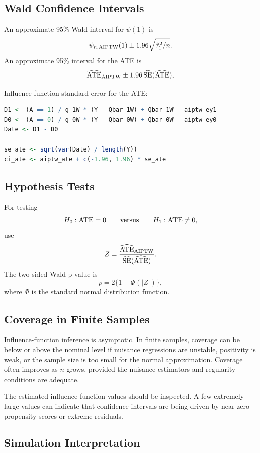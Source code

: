 \subsection{Wald Confidence Intervals}

An approximate 95\% Wald interval for $\psi(1)$ is
\[
\psi_{n,\operatorname{AIPTW}}(1)
\pm
1.96\sqrt{\hat\tau_1^2/n}.
\]
An approximate 95\% interval for the ATE is
\[
\widehat{\operatorname{ATE}}_{\operatorname{AIPTW}}
\pm
1.96\,\widehat{\mathrm{SE}}(\widehat{\operatorname{ATE}}).
\]

\begin{implementationbox}
Influence-function standard error for the ATE:
\begin{lstlisting}[language=R]
D1 <- (A == 1) / g_1W * (Y - Qbar_1W) + Qbar_1W - aiptw_ey1
D0 <- (A == 0) / g_0W * (Y - Qbar_0W) + Qbar_0W - aiptw_ey0
Date <- D1 - D0

se_ate <- sqrt(var(Date) / length(Y))
ci_ate <- aiptw_ate + c(-1.96, 1.96) * se_ate
\end{lstlisting}
\end{implementationbox}

\subsection{Hypothesis Tests}

For testing
\[
H_0:\operatorname{ATE}=0
\qquad\text{versus}\qquad
H_1:\operatorname{ATE}\neq 0,
\]
use
\[
Z=\frac{\widehat{\operatorname{ATE}}_{\operatorname{AIPTW}}}
{\widehat{\mathrm{SE}}(\widehat{\operatorname{ATE}})}.
\]
The two-sided Wald p-value is
\[
p=2\{1-\Phi(|Z|)\},
\]
where $\Phi$ is the standard normal distribution function.

\subsection{Coverage in Finite Samples}

Influence-function inference is asymptotic. In finite samples, coverage can be below
or above the nominal level if nuisance regressions are unstable, positivity is weak, or
the sample size is too small for the normal approximation. Coverage often improves as
$n$ grows, provided the nuisance estimators and regularity conditions are adequate.

The estimated influence-function values should be inspected. A few extremely large
values can indicate that confidence intervals are being driven by near-zero propensity
scores or extreme residuals.

\subsection{Simulation Interpretation}


